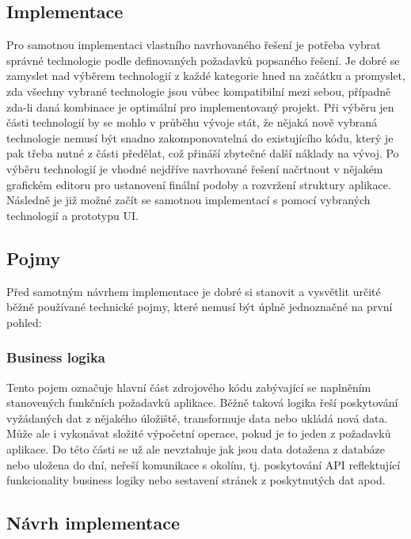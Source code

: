 \begin{itemize}
\begin{itemize}
\section{Implementace}

Pro samotnou implementaci vlastního navrhovaného řešení je potřeba vybrat správné technologie podle definovaných požadavků
popsaného řešení.
Je dobré se zamyslet nad výběrem technologií z každé kategorie hned na začátku a promyslet, zda všechny vybrané technologie
jsou vůbec kompatibilní mezi sebou, případně zda-li daná kombinace je optimální pro implementovaný projekt.
Při výběru jen části technologií by se mohlo v průběhu vývoje stát, že nějaká nově vybraná technologie nemusí být snadno
zakomponovatelná do existujícího kódu, který je pak třeba nutné z části předělat, což přináší zbytečné další náklady na vývoj.
Po výběru technologií je vhodné nejdříve navrhované řešení načrtnout v nějakém grafickém editoru pro ustanovení finální
podoby a rozvržení struktury aplikace.
Následně je již možné začít se samotnou implementací s pomocí vybraných technologií a prototypu \ac{UI}.

	\subsection{Pojmy}

	Před samotným návrhem implementace je dobré si stanovit a vysvětlit určité běžně používané technické pojmy, které
	nemusí být úplně jednoznačné na první pohled:

		\subsubsection{Business logika}

		Tento pojem označuje hlavní část zdrojového kódu zabývající se naplněním stanovených funkčních požadavků aplikace.
		Běžně taková logika řeší poskytování vyžádaných dat z nějakého úložiště, transformuje data nebo ukládá nová data.
		Může ale i vykonávat složité výpočetní operace, pokud je to jeden z požadavků aplikace.
		Do této části se už ale nevztahuje jak jsou data dotažena z databáze nebo uložena do dní, neřeší komunikace
		s okolím, tj. poskytování \ac{API} reflektující funkcionality business logiky nebo sestavení stránek z poskytnutých
		dat apod.

	\subsection{Návrh implementace}


\end{itemize}
\end{itemize}
